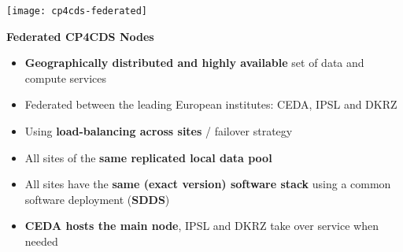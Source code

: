 \documentclass[portrait,a0paper,fontscale=0.4]{baposter} %
\newcommand{\compresslist}{%
\setlength{\itemsep}{1pt}%
\setlength{\parskip}{0pt}%
\setlength{\parsep}{0pt}%
}
\begin{document}
\begin{poster}
{ \begin{minipage}{0.4\textwidth}
    \texttt{[image: cp4cds-federated]}
  \end{minipage}
  \begin{minipage}{0.6\textwidth}
    {\bf Federated CP4CDS Nodes}
    \begin{itemize}\compresslist
      \item {\bf Geographically distributed and highly available} set of data and compute services
      \item Federated between the leading European institutes: CEDA, IPSL and DKRZ
      \item Using {\bf load-balancing across sites} / failover strategy
      \item All sites of the {\bf same replicated local data pool}
      \item All sites have the {\bf same (exact version) software stack} using a common software deployment ({\bf SDDS})
      \item {\bf CEDA hosts the main node}, IPSL and DKRZ take over service when needed
    \end{itemize}
  \end{minipage}
 }



\end{poster}
\end{document}
